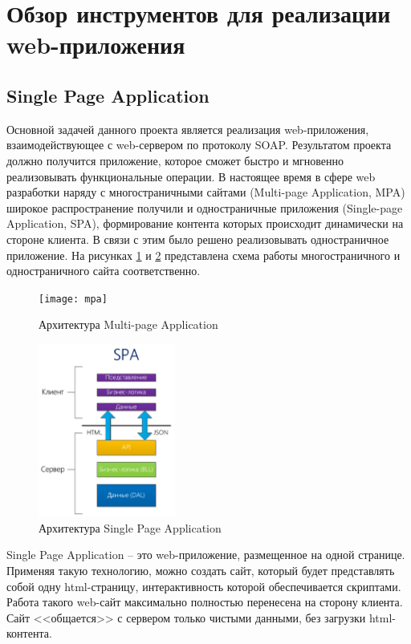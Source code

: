 \section {Обзор инструментов для реализации web-приложения}

\subsection{Single Page Application}

Основной задачей данного проекта является реализация web-приложения, взаимодействующее с web-сервером по протоколу SOAP. Результатом проекта должно получится приложение, которое сможет быстро и мгновенно реализовывать функциональные операции. В настоящее время в сфере web разработки наряду с многостраничными сайтами (Multi-page Application, MPA) широкое распространение получили и одностраничные приложения (Single-page Application, SPA), формирование контента которых происходит динамически на стороне клиента. В связи с этим было решено реализовывать одностраничное приложение. На рисунках  \ref{mpa} и  \ref{spa} представлена схема работы многостраничного и одностраничного сайта соответственно.

\begin{figure}[ht]
\center\texttt{[image: mpa]}
\caption{Архитектура Multi-page Application}\label{mpa}
\end{figure}

\begin{figure}[ht]
\center\includegraphics[width=0.4\textwidth]{spa}
\caption{Архитектура Single Page Application}\label{spa}
\end{figure}

Single Page Application -- это web-приложение, размещенное на одной странице. Применяя такую технологию, можно создать сайт,  который будет представлять собой одну html-страницу, интерактивность которой обеспечивается скриптами. Работа такого web-сайт максимально полностью перенесена на сторону клиента. Сайт <<общается>> с сервером только чистыми данными, без загрузки html-контента.
 
